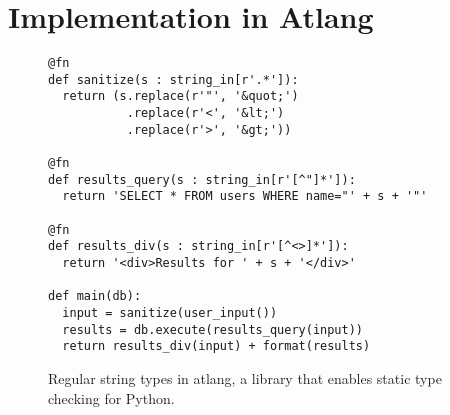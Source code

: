 \documentclass[9pt]{sig-alternate}
\theoremstyle{definition}
\begin{document}
\section{Implementation in {Atlang}}\label{atlang}
\begin{figure}\label{fig:example}
\begin{lstlisting}
@fn
def sanitize(s : string_in[r'.*']):
  return (s.replace(r'"', '&quot;') 
           .replace(r'<', '&lt;')
           .replace(r'>', '&gt;'))

@fn
def results_query(s : string_in[r'[^"]*']):
  return 'SELECT * FROM users WHERE name="' + s + '"'

@fn
def results_div(s : string_in[r'[^<>]*']):
  return '<div>Results for ' + s + '</div>'

def main(db):
  input = sanitize(user_input())
  results = db.execute(results_query(input))
  return results_div(input) + format(results)
\end{lstlisting}
\vspace{-10px}
\caption{Regular string types in atlang, a library that enables static type checking for Python. }
\end{figure}\label{fig:impl}
\end{document}
